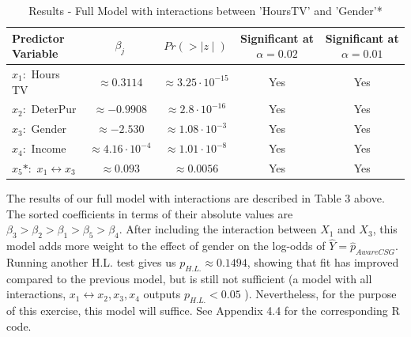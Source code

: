 \documentclass[10pt, oneside,spanish]{article}
\begin{document}
\begin{table}[ht]
\caption{ Results - Full Model with interactions between 'HoursTV' and 'Gender'*} %
\centering %
\begin{tabular}{l c c c c} %
\hline\hline %
Predictor Variable & $\beta_j $ & \textbf{$Pr(>\mid z \mid )$} & Significant at $\alpha = 0.02$ & Significant at $\alpha = 0.01$ \\ [1.5ex] %
\hline %
$x_1:$ Hours TV &  $\approx 0.3114  $ & $\approx 3.25\cdot 10^{-15}$ & Yes & Yes \\ %
$x_2: $ DeterPur & $\approx -0.9908  $ & $\approx 2.8\cdot 10^{-16}$ & Yes & Yes \\
$x_3:$  Gender & $\approx -2.530  $ & $\approx 1.08\cdot 10^{-3}$ & Yes & Yes \\
$x_4:$  Income & $\approx 4.16\cdot 10^{-4}$ & $\approx 1.01\cdot 10^{-8}$ & Yes & Yes   \\%
$x_5*:$  $x_1 \leftrightarrow x_3$ & $\approx 0.093  $ & $\approx 0.0056$ & Yes & Yes  \\[1ex]
\hline %
\end{tabular}
\label{table:allpredint} %
\end{table}


The results of our full model with interactions are described in Table 3 above. The sorted coefficients in terms of their absolute values are $\beta_3  > \beta_2 > \beta_1 > \beta_5 > \beta_4 $. After including the interaction between $X_1$ and $X_3$, this model adds more weight to the effect of gender on the log-odds of $\hat{Y} = \hat{p}_{AwareCSG}$. Running another H.L. test gives us $p_{H.L.} \approx 0.1494$, showing that fit has improved compared to the previous model, but is still not sufficient (a model with all interactions, $x_1 \leftrightarrow x_2,x_3,x_4 $ outputs $p_{H.L.} < 0.05$  ). Nevertheless, for the purpose of this exercise, this model will suffice. See Appendix 4.4 for the corresponding R code.
\end{document}
